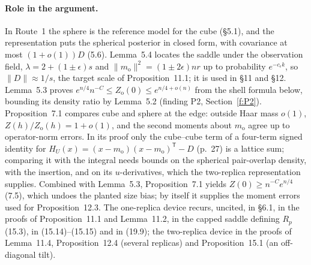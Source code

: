 \documentclass[11pt]{article}
\newcommand{\norm}[1]{\lVert #1\rVert}
\newcommand{\ploc}[2]{#1}
\begin{document}
\paragraph{Role in the argument.}
In Route~1 the sphere is the reference model for the cube
\ploc{(\S5.1)}{profile-spectral.tex:54--65}, and the representation puts
the spherical posterior in closed form, with covariance at most
$(1+o(1))D$ \ploc{(5.6)}{profile-spectral.tex:460--465}.
\ploc{Lemma~5.4}{profile-spectral.tex:563--655} locates the saddle under
the observation field, $\lambda=2+(1\pm\epsilon)s$ and
$\norm{m_{\mathrm o}}^2=(1\pm2\epsilon)nr$ up to probability
$e^{-c_\epsilon k}$, so $\norm D\approx1/s$, the target scale of
\ploc{Proposition~11.1}{profile-local.tex:14--49}; it is used in
\ploc{\S11}{profile-local.tex:74--76} and
\ploc{\S12}{profile-amplification.tex:955--961}.
\ploc{Lemma~5.3}{profile-spectral.tex:520--561} proves
$e^{n/4}n^{-C}\le Z_{\mathrm o}(0)\le e^{n/4+o(n)}$ from the shell formula
below, bounding its density ratio by Lemma~5.2 (finding P2,
Section~\ref{f:P2}).
\ploc{Proposition~7.1}{profile-spectral.tex:1142--1328} compares cube and
sphere at the edge: outside Haar mass $o(1)$,
$Z(h)/Z_{\mathrm o}(h)=1+o(1)$, and the second moments about
$m_{\mathrm o}$ agree up to operator-norm errors. In its proof only the
cube--cube term of a four-term signed identity for
$H_U(x)=(x-m_{\mathrm o})(x-m_{\mathrm o})^{\mathsf T}-D$
\ploc{(p.~27)}{profile-spectral.tex:1215--1242} is a lattice sum;
comparing it with the integral needs bounds on the spherical pair-overlap
density, with the insertion, and on its $u$-derivatives, which the
two-replica representation supplies. Combined with Lemma~5.3,
Proposition~7.1 yields $Z(0)\ge n^{-C}e^{n/4}$
\ploc{(7.5)}{profile-spectral.tex:1341--1347}, which undoes the planted
size bias; by itself it supplies the moment errors used for
\ploc{Proposition~12.3}{profile-amplification.tex:805--818}. The
one-replica device recurs, uncited, in
\ploc{\S6.1}{profile-spectral.tex:818--826}, in the proofs of
\ploc{Proposition~11.1 and Lemma~11.2}{profile-local.tex:128--138; 907--913},
in the capped saddle defining $R_p$ \ploc{(15.3)}{cap-static.tex:118--135},
in \ploc{(15.14)--(15.15)}{cap-static.tex:573--595} and in
\ploc{(19.9)}{cap-entropy.tex:246--281}; the two-replica device in the
proofs of \ploc{Lemma~11.4}{profile-local.tex:1078--1130},
\ploc{Proposition~12.4 (several replicas)}{profile-amplification.tex:1265--1272}
and \ploc{Proposition~15.1 (an off-diagonal tilt)}{cap-static.tex:539--546}.
\end{document}
